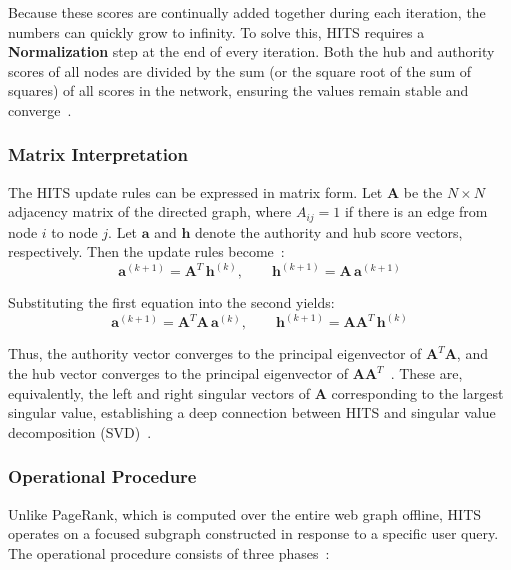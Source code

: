 Because these scores are continually added together during each iteration, the numbers can quickly grow to infinity. To solve this, HITS requires a \textbf{Normalization} step at the end of every iteration. Both the hub and authority scores of all nodes are divided by the sum (or the square root of the sum of squares) of all scores in the network, ensuring the values remain stable and converge~\cite{kleinberg1999hits, ijarcce_comparative}.


\subsubsection{Matrix Interpretation}

The HITS update rules can be expressed in matrix form. Let $\mathbf{A}$ be the $N \times N$ adjacency matrix of the directed graph, where $A_{ij} = 1$ if there is an edge from node $i$ to node $j$. Let $\mathbf{a}$ and $\mathbf{h}$ denote the authority and hub score vectors, respectively. Then the update rules become~\cite{kleinberg1999hits}:
\begin{equation}
\label{eq:hits_matrix_update}
\mathbf{a}^{(k+1)} = \mathbf{A}^{T}\,\mathbf{h}^{(k)}, \qquad \mathbf{h}^{(k+1)} = \mathbf{A}\,\mathbf{a}^{(k+1)}
\end{equation}

Substituting the first equation into the second yields:
\begin{equation}
\label{eq:hits_eigenvector}
\mathbf{a}^{(k+1)} = \mathbf{A}^{T}\mathbf{A}\,\mathbf{a}^{(k)}, \qquad \mathbf{h}^{(k+1)} = \mathbf{A}\mathbf{A}^{T}\,\mathbf{h}^{(k)}
\end{equation}

Thus, the authority vector converges to the principal eigenvector of $\mathbf{A}^{T}\mathbf{A}$, and the hub vector converges to the principal eigenvector of $\mathbf{A}\mathbf{A}^{T}$~\cite{kleinberg1999hits}. These are, equivalently, the left and right singular vectors of $\mathbf{A}$ corresponding to the largest singular value, establishing a deep connection between HITS and singular value decomposition (SVD)~\cite{ijarcce_comparative}.


\subsubsection{Operational Procedure}

Unlike PageRank, which is computed over the entire web graph offline, HITS operates on a focused subgraph constructed in response to a specific user query. The operational procedure consists of three phases~\cite{kleinberg1999hits}:

